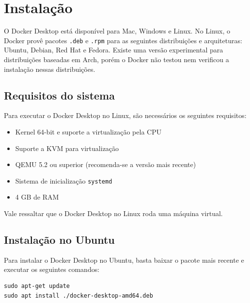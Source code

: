 \section{Instalação}

O Docker Desktop está disponível para Mac, Windows e Linux. No Linux, o Docker provê pacotes \texttt{.deb} e \texttt{.rpm} para as seguintes distribuições e arquiteturas: Ubuntu, Debian, Red Hat e Fedora. Existe uma versão experimental para distribuições baseadas em Arch, porém o Docker não testou nem verificou a instalação nessas distribuições.

\subsection{Requisitos do sistema}

Para executar o Docker Desktop no Linux, são necessários os seguintes requisitos:

\begin{itemize}
    \item Kernel 64-bit e suporte a virtualização pela CPU
    \item Suporte a KVM para virtualização
    \item QEMU 5.2 ou superior (recomenda-se a versão mais recente)
    \item Sistema de inicialização \texttt{systemd}
    \item 4 GB de RAM
\end{itemize}

Vale ressaltar que o Docker Desktop no Linux roda uma máquina virtual.

\subsection{Instalação no Ubuntu}

Para instalar o Docker Desktop no Ubuntu, basta baixar o pacote mais recente e executar os seguintes comandos:

\begin{verbatim}
sudo apt-get update
sudo apt install ./docker-desktop-amd64.deb
\end{verbatim}
